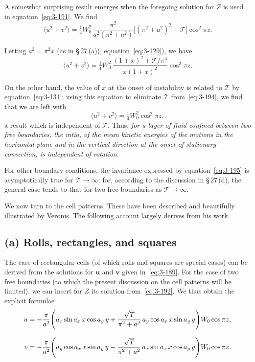 A somewhat surprising result emerges when the foregoing solution for $Z$ is used in equation~\eqref{eq:3-191}. We find
\begin{equation}\label{eq:3-193}
\langle u^2 + v^2\rangle = \tfrac{1}{4}W_0^2\,\frac{\pi^2}{a^2(\pi^2 + a^2)}\bigl[(\pi^2 + a^2)^2 + \mathscr{T}\bigr]\cos^2\!\pi z.
\end{equation}

Letting $a^2 = \pi^2 x$ (as in \S\,27\,(a)), equation~\eqref{eq:3-129}), we have
\begin{equation}\label{eq:3-194}
\langle u^2 + v^2\rangle = \tfrac{1}{4}W_0^2\,\frac{(1+x)^2 + \mathscr{T}/\pi^4}{x(1+x)^2}\cos^2\!\pi z.
\end{equation}

On the other hand, the value of $x$ at the onset of instability is related to $\mathscr{T}$ by equation~\eqref{eq:3-131}; using this equation to eliminate $\mathscr{T}$ from~\eqref{eq:3-194}, we find that we are left with
\begin{equation}\label{eq:3-195}
\langle u^2 + v^2\rangle = \tfrac{1}{4}W_0^2\cos^2\!\pi z,
\end{equation}
a result which is independent of $\mathscr{T}$. Thus, \emph{for a layer of fluid confined between two free boundaries, the ratio, of the mean kinetic energies of the motions in the horizontal plane and in the vertical direction at the onset of stationary convection, is independent of rotation}.

For other boundary conditions, the invariance expressed by equation~\eqref{eq:3-195} is asymptotically true for $\mathscr{T}\to\infty$: for, according to the discussion in \S\,27\,(d), the general case tends to that for two free boundaries as $\mathscr{T}\to\infty$.

We now turn to the cell patterns. These have been described and beautifully illustrated by Veronis. The following account largely derives from his work.

\subsection*{(a) Rolls, rectangles, and squares}

The case of rectangular cells (of which rolls and squares are special cases) can be derived from the solutions for $\mathbf{u}$ and $\mathbf{v}$ given in~\eqref{eq:3-189}. For the case of two free boundaries (to which the present discussion on the cell patterns will be limited), we can insert for $Z$ its solution from~\eqref{eq:3-192}. We thus obtain the explicit formulae
\begin{align}
\mathbf{u} &= -\frac{\pi}{a^2}\!\left(a_x\sin a_x\, x\cos a_y\, y + \frac{\sqrt{\mathscr{T}}}{\pi^2 + a^2}\,a_y\cos a_x\, x\sin a_y\, y\right)\!W_0\cos\pi z, \notag\\[6pt]
\mathbf{v} &= -\frac{\pi}{a^2}\!\left(a_y\cos a_x\, x\sin a_y\, y - \frac{\sqrt{\mathscr{T}}}{\pi^2 + a^2}\,a_x\sin a_x\, x\cos a_y\, y\right)\!W_0\cos\pi z. \label{eq:3-196}
\end{align}

